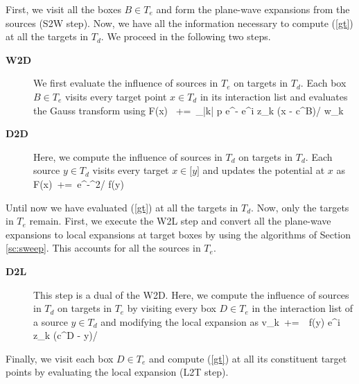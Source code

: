 First, we visit all the boxes $B \in T_e$ and form the plane-wave expansions from the sources (S2W step). Now, we have 
all the information necessary to compute (\ref{gt}) at all the targets in $T_d$. We proceed in the following two steps.
\begin{description}
\item[\textbf{W2D}] We first evaluate the influence of sources in $T_e$ on targets in $T_d$. Each box $B \in T_e$ visits
 every target point $x \in T_d$ in its interaction list and evaluates the Gauss transform using
%
\beq F(x) \, +=\, \sum_{|k| \leq p} e^{-} e^{i z_k \cdot (x - c^B)/\sqrt{\delta}} w_k \eeq
%
\item[\textbf{D2D}] Here, we compute the influence of sources in $T_d$ on targets in $T_d$. Each source $y \in T_d$ visits 
every target $x \in \mathcal[y]$ and updates the potential at $x$ as 
%  
\beq F(x) \,+=\, e^{-^2/\sqrt{\delta}} f(y) \eeq
%
\end{description}
%
Until now we have evaluated (\ref{gt}) at all the targets in $T_d$. Now, only the targets in $T_e$ remain. First, we execute
 the W2L step and convert all the plane-wave expansions to local expansions at target boxes by using the algorithms of 
 Section \ref{sc:sweep}. This accounts for all the sources in $T_e$. 

\begin{description}
\item[\textbf{D2L}] This step is a dual of the W2D. Here, we compute the influence of sources in $T_d$ on targets in $T_e$ by 
visiting every box $D \in T_e$ in the interaction list of a source $y \in T_d$ and modifying the local expansion as 
%
\beq v_k  \,+=\, \, f(y) e^{i z_k \cdot (c^D - y)/\sqrt{\delta}} \eeq
\end{description}
Finally, we visit each box $D \in T_e$ and compute (\ref{gt}) at all its constituent target points by evaluating the 
local expansion (L2T step). 
